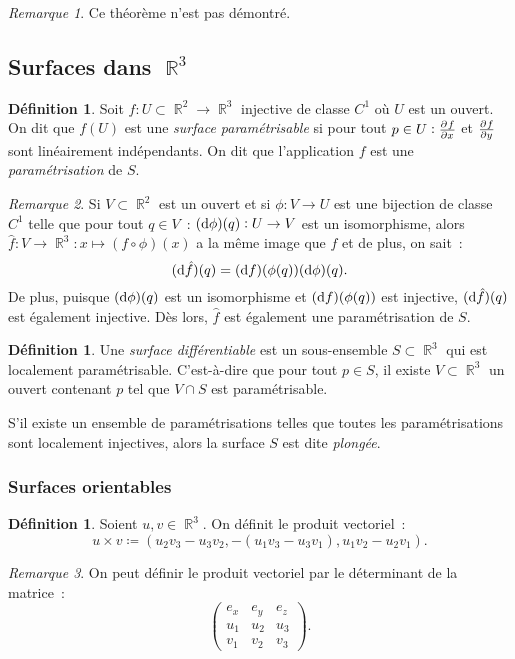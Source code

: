 \documentclass{article}
\DeclareMathOperator{\R}{\mathbb R}
\theoremstyle{definition}
\newtheorem{déf}[thm]{Définition}
\theoremstyle{remark}
\newtheorem*{rmq}{Remarque}
\begin{document}
		\begin{rmq} Ce théorème n'est pas démontré. \end{rmq}

	\subsection{Surfaces dans $\R^3$}
		\begin{déf} Soit $f : U \subset \R^2 \to \R^3$ injective de classe $C^1$ où $U$ est un ouvert. On dit que $f(U)$ est une \emph{surface paramétrisable} si
		pour tout $p \in U : \pd fx$ et $\pd fy$ sont linéairement indépendants. On dit que l'application $f$ est une \emph{paramétrisation} de $S$.
		\end{déf}

		\begin{rmq} Si $V \subset \R^2$ est un ouvert et si $\phi : V \to U$ est une bijection de classe $C^1$ telle que pour tout $q \in V$~:
		$(\dif \phi)(q) : U \to V$ est un isomorphisme, alors $\hat f : V \to \R^3 : x \mapsto (f \circ \phi)(x)$ a la même image que $f$ et de plus, on sait~:
		\[(\dif \hat f)(q) = (\dif f)(\phi(q))(\dif \phi)(q).\]
		De plus, puisque $(\dif \phi)(q)$ est un isomorphisme et $(\dif f)(\phi(q))$ est injective, $(\dif \hat f)(q)$ est également injective. Dès lors, $\hat f$
		est également une paramétrisation de $S$.
		\end{rmq}

		\begin{déf} Une \emph{surface différentiable} est un sous-ensemble $S \subset \R^3$ qui est localement paramétrisable. C'est-à-dire que pour tout
		$p \in S$, il existe $V \subset \R^3$ un ouvert contenant $p$ tel que $V \cap S$ est paramétrisable.

		S'il existe un ensemble de paramétrisations telles que toutes les paramétrisations sont localement injectives, alors la surface $S$ est dite
		\emph{plongée}.
		\end{déf}

		\subsubsection{Surfaces orientables}
		\begin{déf} Soient $u, v \in \R^3$. On définit le produit vectoriel~:
		\[u \times v \coloneqq \left(u_2v_3 - u_3v_2, -(u_1v_3 - u_3v_1), u_1v_2 - u_2v_1\right).\]
		\end{déf}

		\begin{rmq} On peut définir le produit vectoriel par le déterminant de la matrice~:
		\[\begin{pmatrix}
			e_x & e_y & e_z \\
			u_1 & u_2 & u_3 \\
			v_1 & v_2 & v_3
		\end{pmatrix}.\]
		\end{rmq}
\end{document}
